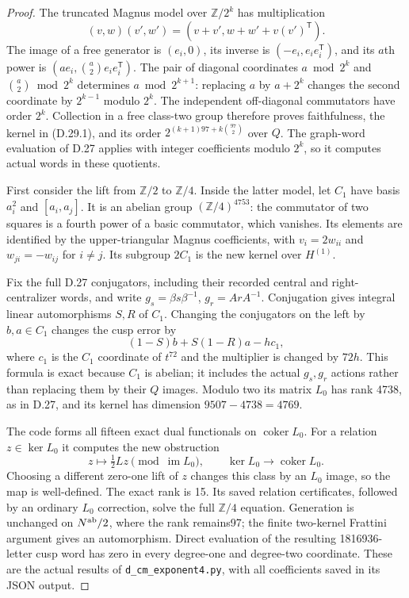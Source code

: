 \begin{proof}
The truncated Magnus model over $\mathbb Z/2^k$ has
multiplication
\[
 (v,w)(v',w')=(v+v',w+w'+v(v')^{\mathsf T}).             \tag{D.29.5}
\]
The image of a free generator is $(e_i,0)$, its inverse
is $(-e_i,e_ie_i^{\mathsf T})$, and its $a$th power is
$(ae_i,\binom a2 e_ie_i^{\mathsf T})$. The pair of
diagonal coordinates $a\bmod2^k$ and $\binom a2\bmod2^k$
determines $a\bmod2^{k+1}$: replacing $a$ by $a+2^k$
changes the second coordinate by $2^{k-1}$ modulo $2^k$.
The independent off-diagonal commutators have order $2^k$.
Collection in a free class-two group therefore proves
faithfulness, the kernel in (D.29.1), and its order
$2^{(k+1)97+k\binom{97}{2}}$ over $Q$.
The graph-word evaluation of D.27 applies with integer
coefficients modulo $2^k$, so it computes actual words
in these quotients.

First consider the lift from $\mathbb Z/2$ to
$\mathbb Z/4$. Inside the latter model, let $C_1$ have
basis $a_i^2$ and $[a_i,a_j]$. It is an abelian group
$(\mathbb Z/4)^{4753}$: the commutator of two squares
is a fourth power of a basic commutator, which vanishes.
Its elements are identified by the upper-triangular
Magnus coefficients, with $v_i=2w_{ii}$ and
$w_{ji}=-w_{ij}$ for $i\ne j$. Its subgroup $2C_1$ is
the new kernel over $H^{(1)}$.

Fix the full D.27 conjugators, including their recorded
central and right-centralizer words, and write
$g_s=\beta s\beta^{-1}$, $g_r=ArA^{-1}$.
Conjugation gives integral linear automorphisms $S,R$ of
$C_1$. Changing the conjugators on the left by $b,a\in C_1$
changes the cusp error by
\[
       (1-S)b+S(1-R)a-hc_1,                            \tag{D.29.6}
\]
where $c_1$ is the $C_1$ coordinate of $t^{72}$ and the
multiplier is changed by $72h$. This formula is exact
because $C_1$ is abelian; it includes the actual $g_s,g_r$
actions rather than replacing them by their $Q$ images.
Modulo two its matrix $L_0$ has rank 4738, as in D.27,
and its kernel has dimension $9507-4738=4769$.

The code forms all fifteen exact dual functionals on
$\operatorname{coker}L_0$. For a relation $z\in\ker L_0$
it computes the new obstruction
\[
 z\longmapsto\tfrac12 Lz\pmod{\operatorname{im}L_0},
 \qquad
 \ker L_0\longrightarrow\operatorname{coker}L_0.        \tag{D.29.7}
\]
Choosing a different zero-one lift of $z$ changes this
class by an $L_0$ image, so the map is well-defined.
The exact rank is 15. Its saved relation certificates,
followed by an ordinary $L_0$ correction, solve the full
$\mathbb Z/4$ equation. Generation is unchanged on
$N^{\rm ab}/2$, where the rank remains97; the finite
two-kernel Frattini argument gives an automorphism.
Direct evaluation of the resulting 1816936-letter cusp
word has zero in every degree-one and degree-two
coordinate. These are the actual results of
\texttt{d\_cm\_exponent4.py}, with all coefficients saved
in its JSON output.


\end{proof}
